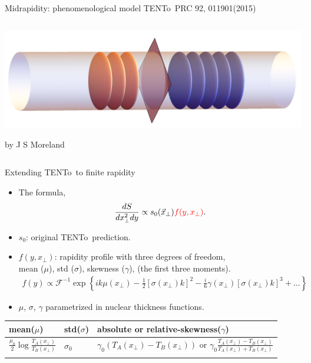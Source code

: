 \documentclass[11pt]{beamer}
\newcommand{\TRENTo}{T\raisebox{-0.2em}{R}ENTo~}
\begin{document}
\begin{frame}{Midrapidity: phenomenological model \TRENTo \tiny PRC 92, 011901(2015)}
\begin{columns}
\begin{column}{0.35\textwidth}
\includegraphics[width=\textwidth]{traincar-crop.pdf}\\
\begin{center}
\tiny by J S Moreland
\end{center}
\end{column}
\end{columns}
\end{frame}

\begin{frame}{Extending \TRENTo to finite rapidity}
\begin{itemize}
\item The formula,
\begin{eqnarray}\nonumber 
\frac{dS}{dx_\perp^2d y} \propto  s_0(\vec{x}_\perp) {\color{red}f(y, x_\perp)}.
\end{eqnarray} 
\item $s_0$: original \TRENTo prediction.
\item {\color{red} $f(y, x_\perp)$}: rapidity profile with three degrees of freedom,\\
mean ($\mu$), std ($\sigma$), skewness ($\gamma$), (the first three moments).
\begin{eqnarray}\nonumber 
f(y) \propto \mathcal{F}^{-1}\exp\left\{ik\mu(x_\perp) -\frac{1}{2}[\sigma(x_\perp) k]^2 - \frac{i}{6}\gamma(x_\perp)[\sigma(x_\perp) k]^3 + ...\right\}
\end{eqnarray}
\item $\mu$, $\sigma$, $\gamma$ parametrized in nuclear thickness functions.
\end{itemize}
\begin{center}
\begin{tabularx}{0.95\textwidth}{p{2.3cm}p{1.2cm}p{8.2cm}}
\hline
mean($\mu$) & std($\sigma$) &$\left.\right.${\color{red!70}absolute} or {\color{blue!70}relative}-skewness($\gamma$) \\
\hline
\noalign{\smallskip}
$\frac{\mu_0}{2} \log\frac{T_A(x_\perp)}{T_B(x_\perp)}$ & $\sigma_0$ & $\left.\right.${\color{red!70}$\gamma_0(T_A(x_\perp)-T_B(x_\perp))$} 
or 
{\color{blue!70}$\gamma_0\frac{T_A(x_\perp)-T_B(x_\perp)}{T_A(x_\perp)+T_B(x_\perp)}$} \\
\noalign{\smallskip}
\hline
\end{tabularx}
\end{center}
\end{frame}
\end{document}
